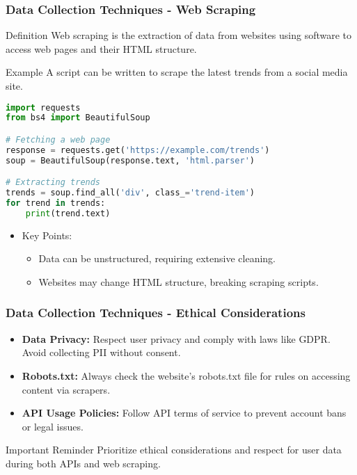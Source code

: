 \documentclass{beamer}
\begin{document}
\begin{frame}[fragile]
    \frametitle{Data Collection Techniques - Web Scraping}
    \begin{block}{Definition}
        Web scraping is the extraction of data from websites using software to access web pages and their HTML structure.
    \end{block}

    \begin{block}{Example}
        A script can be written to scrape the latest trends from a social media site.
    \end{block}

    \begin{lstlisting}[language=Python]
import requests
from bs4 import BeautifulSoup

# Fetching a web page
response = requests.get('https://example.com/trends')
soup = BeautifulSoup(response.text, 'html.parser')

# Extracting trends
trends = soup.find_all('div', class_='trend-item')
for trend in trends:
    print(trend.text)
    \end{lstlisting}
    
    \begin{itemize}
        \item Key Points:
        \begin{itemize}
            \item Data can be unstructured, requiring extensive cleaning.
            \item Websites may change HTML structure, breaking scraping scripts.
        \end{itemize}
    \end{itemize}
\end{frame}

\begin{frame}
    \frametitle{Data Collection Techniques - Ethical Considerations}
    \begin{itemize}
        \item \textbf{Data Privacy:} Respect user privacy and comply with laws like GDPR. Avoid collecting PII without consent.
        \item \textbf{Robots.txt:} Always check the website's robots.txt file for rules on accessing content via scrapers.
        \item \textbf{API Usage Policies:} Follow API terms of service to prevent account bans or legal issues.
    \end{itemize}
    
    \begin{block}{Important Reminder}
        Prioritize ethical considerations and respect for user data during both APIs and web scraping.
    \end{block}
\end{frame}
\end{document}
